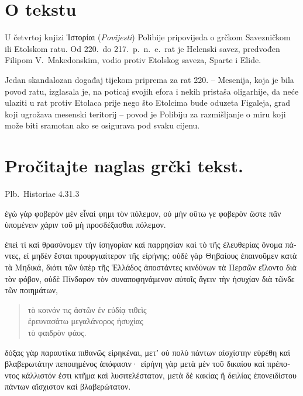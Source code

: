 

\section*{O tekstu}

U četvrtoj knjizi \textgreek[variant=ancient]{Ἱστορίαι} (\textit{Povijesti}) Polibije pripovijeda o grčkom Savezničkom ili Etolskom ratu. Od 220.\ do 217.\ p.~n.~e.\ rat je Helenski savez, predvođen Filipom V.\ Makedonskim, vodio protiv Etolskog saveza, Sparte i Elide.

Jedan skandalozan događaj tijekom priprema za rat 220. – Mesenija, koja je bila povod ratu, izglasala je, na poticaj svojih efora i nekih pristaša oligarhije, da neće ulaziti u rat protiv Etolaca prije nego što Etolcima bude oduzeta Figaleja, grad koji ugrožava mesenski teritorij – povod je Polibiju za razmišljanje o miru koji može biti sramotan ako se osigurava pod svaku cijenu.





\section*{Pročitajte naglas grčki tekst.}

Plb.\ Historiae 4.31.3

\medskip


{\large

\begin{greek}

\noindent ἐγὼ γὰρ φοβερὸν μὲν εἶναί φημι τὸν πόλεμον, οὐ μὴν οὕτω γε φοβερὸν ὥστε πᾶν ὑπομένειν χάριν τοῦ μὴ προσδέξασθαι πόλεμον.

\noindent ἐπεὶ τί καὶ θρασύνομεν τὴν ἰσηγορίαν καὶ παρρησίαν καὶ τὸ τῆς ἐλευθερίας ὄνομα πάντες, εἰ μηδὲν ἔσται προυργιαίτερον τῆς εἰρήνης; οὐδὲ γὰρ Θηβαίους ἐπαινοῦμεν κατὰ τὰ Μηδικά, διότι τῶν ὑπὲρ τῆς Ἑλλάδος ἀποστάντες κινδύνων τὰ Περσῶν εἵλοντο διὰ τὸν φόβον, οὐδὲ Πίνδαρον τὸν συναποφηνάμενον αὐτοῖς ἄγειν τὴν ἡσυχίαν διὰ τῶνδε τῶν ποιημάτων,
\begin{verse}
τὸ κοινόν τις ἀστῶν ἐν εὐδίᾳ τιθεὶς\\
ἐρευνασάτω μεγαλάνορος ἡσυχίας\\
τὸ φαιδρὸν φάος.\\

\end{verse}
δόξας γὰρ παραυτίκα πιθανῶς εἰρηκέναι, μετʼ οὐ πολὺ πάντων αἰσχίστην εὑρέθη καὶ βλαβερωτάτην πεποιημένος ἀπόφασιν· εἰρήνη γὰρ μετὰ μὲν τοῦ δικαίου καὶ πρέποντος κάλλιστόν ἐστι κτῆμα καὶ λυσιτελέστατον, μετὰ δὲ κακίας ἢ δειλίας ἐπονειδίστου πάντων αἴσχιστον καὶ βλαβερώτατον.

\end{greek}

}

